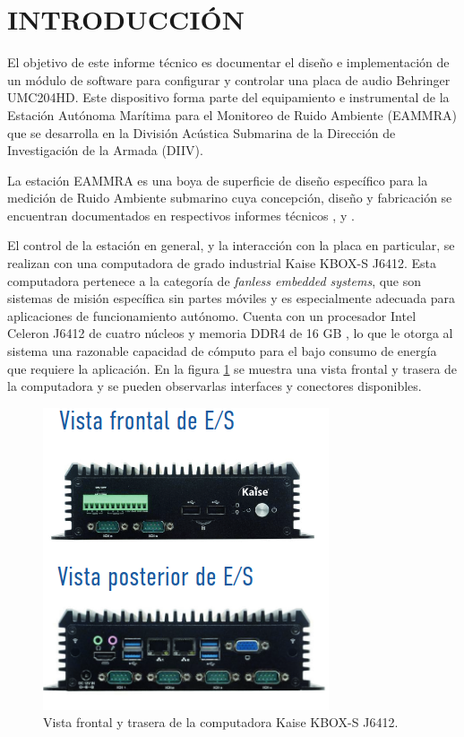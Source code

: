 \section{INTRODUCCIÓN}


El objetivo de este informe técnico es documentar el diseño e implementación de un módulo de software para configurar y controlar una placa de audio Behringer UMC204HD.  Este dispositivo forma parte del equipamiento e instrumental de la Estación Autónoma Marítima para el Monitoreo de Ruido Ambiente (EAMMRA) que se desarrolla en la División Acústica Submarina de la Dirección de Investigación de la Armada (DIIV). 

La estación EAMMRA es una boya de superficie de diseño específico para la medición de Ruido Ambiente submarino cuya concepción, diseño y fabricación se encuentran documentados en respectivos informes técnicos \citep{EAMMRA_ingConceptual}, \citep{EAMMRA_diseno} y \citep{EAMMRA_subsistemas}.  

El control de la estación en general, y la interacción con la placa en particular, se realizan con una computadora de grado industrial Kaise KBOX-S J6412. Esta computadora pertenece a la categoría de \textit{fanless embedded systems}, que son sistemas de misión específica sin partes móviles y es especialmente adecuada para aplicaciones de funcionamiento autónomo.  Cuenta con un procesador Intel Celeron J6412 de cuatro núcleos y memoria DDR4 de 16 GB \citep{kaise}, lo que le otorga al sistema una razonable capacidad de cómputo para el bajo consumo de energía que requiere la aplicación. En la figura \ref{fig:kaise} se muestra una vista frontal y trasera de la computadora y se pueden observarlas interfaces y conectores disponibles.
 
\begin{figure}[htpb]
    \centering
    \includegraphics[width=.44\textwidth]{graficos/kaise.png}
    \caption{Vista frontal y trasera de la computadora Kaise KBOX-S J6412.}
    \label{fig:kaise}
\end{figure}


